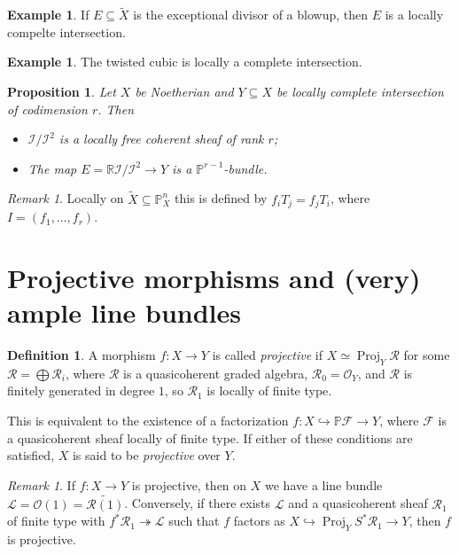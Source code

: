 \documentclass[leqno, openany]{memoir}
\newtheorem{prop}[thm]{Proposition}
\theoremstyle{definition}
\newtheorem{defn}[thm]{Definition}
\newtheorem{exm}[thm]{Example}
\theoremstyle{remark}
\newtheorem{rmk}[thm]{Remark}
\theoremstyle{plain}
\theoremstyle{definition}
\theoremstyle{remark}
\newcommand{\R}{\mathbb{R}}
\renewcommand{\P}{\mathbb{P}}
\newcommand{\mc}[1]{\mathcal{#1}}
\newcommand{\wt}[1]{\widetilde{#1}}
\DeclareMathOperator{\Proj}{Proj}
\begin{document}
\begin{exm}
    If $E \subseteq \wt{X}$ is the exceptional divisor of a blowup, then $E$ is a locally compelte intersection.
\end{exm}

\begin{exm}
    The twisted cubic is locally a complete intersection.
\end{exm}

\begin{prop}
    Let $X$ be Noetherian and $Y \subseteq X$ be locally complete intersection of codimension $r$. Then
    \begin{itemize}
        \item $\mc{I} / \mc{I}^2$ is a locally free coherent sheaf of rank $r$;
        \item The map $E = \R \mc{I}/\mc{I}^2 \to Y$ is a $\P^{r-1}$-bundle.
    \end{itemize}
\end{prop}

\begin{rmk}
    Locally on $\wt{X} \subseteq \P^n_X$ this is defined by $f_i T_j = f_j T_i$, where $I = (f_1, \ldots, f_r)$.
\end{rmk}

\section{Projective morphisms and (very) ample line bundles}%
\label{sec:projective_morphisms_and_very_ample_line_bundles}

\begin{defn}
    A morphism $f \colon X \to Y$ is called \textit{projective} if $X \simeq \Proj_Y \mc{R}$ for some $\mc{R} = \bigoplus \mc{R}_i$, where $\mc{R}$ is a quasicoherent graded algebra, $\mc{R}_0 = \mc{O}_Y$, and $\mc{R}$ is finitely generated in degree $1$, so $\mc{R}_1$ is locally of finite type.
\end{defn}

This is equivalent to the existence of a factorization $f \colon X \hookrightarrow \P \mc{F} \to Y$, where $\mc{F}$ is a quasicoherent sheaf locally of finite type. If either of these conditions are satisfied, $X$ is said to be \textit{projective} over $Y$.

\begin{rmk}
    If $f \colon X \to Y$ is projective, then on $X$ we have a line bundle $\mc{L} = \mc{O}(1) = \wt{\mc{R}(1)}$. Conversely, if there exists $\mc{L}$ and a quasicoherent sheaf $\mc{R}_1$ of finite type with $f^* \mc{R}_1 \twoheadrightarrow \mc{L}$ such that $f$ factors as $X \hookrightarrow \Proj_Y S^* \mc{R}_1 \to Y$, then $f$ is projective.
\end{rmk}
\end{document}
